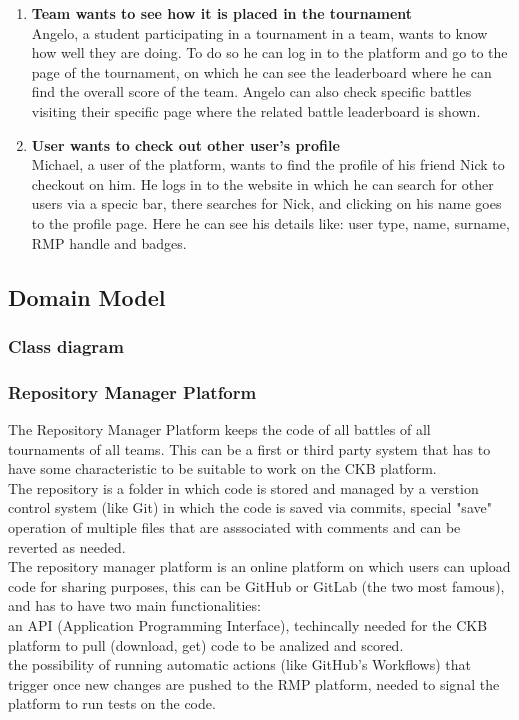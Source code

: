 \begin{enumerate}[label=$\bullet$ \textbf{SC\arabic*:}]
    \item \textbf{Team wants to see how it is placed in the tournament}\\ Angelo, a student participating in a tournament in a team, wants to know how well they are doing. To do so he can log in to the platform and go to the page of the tournament, on which he can see the leaderboard where he can find the overall score of the team. Angelo can also check specific battles visiting their specific page where the related battle leaderboard is shown.
    \item \textbf{User wants to check out other user's profile}\\ Michael, a user of the platform, wants to find the profile of his friend Nick to checkout on him. He logs in to the website in which he can search for other users via a specic bar, there searches for Nick, and clicking on his name goes to the profile page. Here he can see his details like: user type, name, surname, RMP handle and badges.
\end{enumerate}
\subsection{Domain Model}
\subsubsection{Class diagram}
\subsubsection{Repository Manager Platform}
The Repository Manager Platform keeps the code of all battles of all tournaments of all teams. This can be a first or third party system that has to have some characteristic to be suitable to work on the CKB platform.\\
The repository is a folder in which code is stored and managed by a verstion control system (like Git) in which the code is saved via commits, special "save" operation of multiple files that are asssociated with comments and can be reverted as needed.\\
The repository manager platform is an online platform on which users can upload code for sharing purposes, this can be GitHub or GitLab (the two most famous), and has to have two main functionalities:\\
    an API (Application Programming Interface), techincally needed for the CKB platform to pull (download, get) code to be analized and scored.\\
    the possibility of running automatic actions (like GitHub's Workflows) that trigger once new changes are pushed to the RMP platform, needed to signal the platform to run tests on the code.
